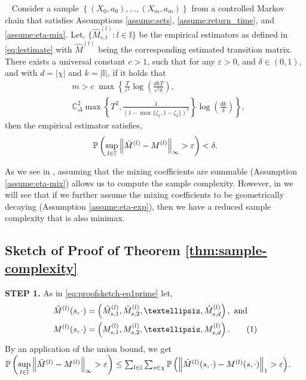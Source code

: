 \documentclass[opre,sglanonrev]{informs4}
\numberwithin{equation}{section}
\newcommand{\pow}[1]{^{(#1)}}
\newcommand{\lp}{\left(}
\newcommand{\rp}{\right)}
\newcommand{\lc}{\left\{}
\newcommand{\rc}{\right\}}
\newcommand{\ldot}{\left.}
\newcommand{\rdot}{\right.}
\newcommand{\Cbb}{\mathbb{C}}
\newcommand{\Ibb}{\mathbb{I}}
\newcommand{\Pbb}{\mathbb{P}}
\newcommand{\constant}{\Cbb}
\newcommand{\indexeddata}{\left\{(X_0,a_0),\dots,(X_m,a_m)\right\}}
\newcommand{\hatmls}{\Hat{M}^{(l)}(s,\cdot)}
\newcommand{\mls}{{M}^{(l)}(s,\cdot)}
\newcommand\numberthis{\addtocounter{equation}{1}\tag{\theequation}}
\newcommand{\prob}{\Pbb}
\newcommand{\eps}{\varepsilon}
\renewcommand{\epsilon}{\eps}
\begin{document}
{\begin{theorem}~\label{thm:sample-complexity}
Consider a sample $\indexeddata$ from a controlled Markov chain that satisfies Assumptions \ref{assume:sets}, \ref{assume:return_time}, and \ref{assume:eta-mix}.
Let, $\{\hat M_{s,t}^{(l)} : l \in \Ibb\}$ be the empirical estimators as defined in \cref{eq:lestimate} with $\hat M\pow{l}$ being the corresponding estimated transition matrix.
There exists a universal constant $c>1$, such that for any $\epsilon>0$, and $\delta \in (0,1)$,  and with $d = |\chi|$ and $k = |\Ibb|$,
if it holds that
\begin{align*}
  & m>c \; \max\left\{\frac{T}{\eps^2}\log\lp \frac{dkT}{\epsilon^2\delta} \rp,\rdot\\  &\ldot\constant_\Delta^2\max\lc {T}^2, \frac{1}{\lp 1-\max\{\zeta_1,1-\zeta_2\}\rp^2}\rc \log\lp \frac{dk}{\delta} \rp\right\},
\end{align*} 
then the empirical estimator satisfies,
\begin{align}
  \prob\left(\underset{l\in \Ibb}{\sup} \left\|\Hat{M}^{(l)}-M^{(l)}\right\|_{\infty}>\epsilon  \right)< \delta.
\end{align}
\end{theorem}
 As we see in , assuming that the mixing coefficients are summable (Assumption \ref{assume:eta-mix}) allows us to compute the sample complexity. 
However, in  we will see that if we further assume the mixing coefficients to be geometrically decaying (Assumption \ref{assume:eta-exp}), then we have a reduced sample complexity that is also minimax. 




\subsection{Sketch of Proof of Theorem \ref{thm:sample-complexity}}\label{sec:prf-skt-sampcomp} 
\textbf{STEP 1.} As in \cref{eq:proofsketch-eq1prime} let,
\begin{align*}
    \hatmls & =\left(\Hat{M}_{s,1}^{(l)},\Hat{M}_{s,2}^{(l)},\dots,\Hat{M}_{s,d}^{(l)} \right), \text{ and }\\
    \mls & =\left({M}_{s,1}^{(l)},{M}_{s,2}^{(l)},\dots,{M}_{s,d}^{(l)}\right).\numberthis\label{eq:proofsketch-eq1}
\end{align*}
By an application of the union bound, we get $\prob\left(\underset{l\in \Ibb}{\sup} \left\|\Hat{M}^{(l)}-M^{(l)} \right\|_{\infty}>\epsilon  \right)\leq \sum_{l\in\Ibb}\sum_{s\in\chi} \prob\left(\left\|\hatmls-\mls\right\|_1 > \epsilon\right)$.

}
\end{document}

